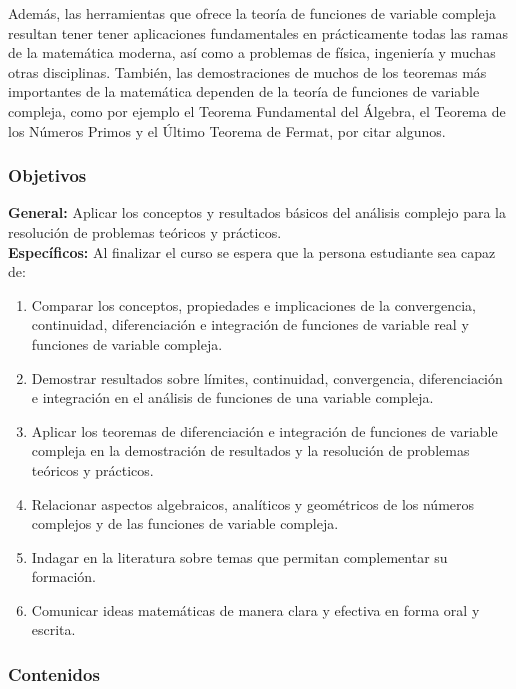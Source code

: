 \begin{refsection}
Además, las herramientas que ofrece la teoría de funciones de variable compleja resultan tener tener aplicaciones fundamentales en prácticamente todas las ramas de la matemática moderna, así como a problemas de física, ingeniería y muchas otras disciplinas. También, las demostraciones de muchos de los teoremas más importantes de la matemática dependen de la teoría de funciones de variable compleja, como por ejemplo el Teorema Fundamental del Álgebra, el Teorema de los Números Primos y el Último Teorema de Fermat, por citar algunos. 



\subsubsection*{Objetivos}

\textbf{General:} Aplicar los conceptos y resultados básicos del análisis complejo para la resolución de problemas teóricos y prácticos. \\

\textbf{Específicos:} Al finalizar el curso se espera que la persona estudiante sea capaz de:

\begin{enumerate}
\item Comparar los conceptos, propiedades e implicaciones de la convergencia, continuidad, diferenciación e integración de funciones de variable real y funciones de variable compleja.
\item Demostrar resultados sobre límites, continuidad, convergencia, diferenciación e integración en el análisis de funciones de una variable compleja.
\item Aplicar los teoremas de diferenciación e integración de funciones de variable compleja en la demostración de resultados y la resolución de problemas teóricos y prácticos.
\item Relacionar aspectos algebraicos, analíticos y geométricos de los números complejos y de las funciones de variable compleja.
\item Indagar en la literatura sobre temas que permitan complementar su formación.
\item Comunicar ideas matemáticas de manera clara y efectiva en forma oral y escrita.
\end{enumerate}

\subsubsection*{Contenidos}


\end{refsection}
